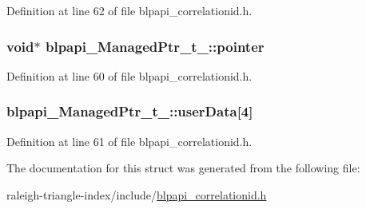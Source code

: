 Definition at line 62 of file blpapi\+\_\+correlationid.\+h.

\subsubsection[{\texorpdfstring{pointer}{pointer}}]{\setlength{\rightskip}{0pt plus 5cm}void$\ast$ blpapi\+\_\+\+Managed\+Ptr\+\_\+t\+\_\+\+::pointer}\hypertarget{structblpapi___managed_ptr__t___af5a90f9f34e8ebb8465b1d1d47efd70f}{}\label{structblpapi___managed_ptr__t___af5a90f9f34e8ebb8465b1d1d47efd70f}


Definition at line 60 of file blpapi\+\_\+correlationid.\+h.

\subsubsection[{\texorpdfstring{user\+Data}{userData}}]{ blpapi\+\_\+\+Managed\+Ptr\+\_\+t\+\_\+\+::user\+Data\mbox{[}4\mbox{]}}\hypertarget{structblpapi___managed_ptr__t___a710c979ff6ce427bd77443520ea4731e}{}\label{structblpapi___managed_ptr__t___a710c979ff6ce427bd77443520ea4731e}


Definition at line 61 of file blpapi\+\_\+correlationid.\+h.



The documentation for this struct was generated from the following file\+:\begin{DoxyCompactItemize}
\item 
raleigh-\/triangle-\/index/include/\hyperlink{blpapi__correlationid_8h}{blpapi\+\_\+correlationid.\+h}\end{DoxyCompactItemize}
